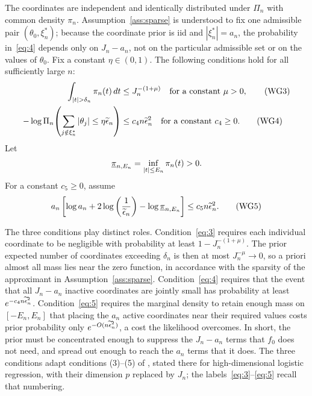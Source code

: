 \begin{assumption}\label{ass:prior}
The coordinates are independent and identically distributed under $\Pi_n$ with common density $\pi_n$. Assumption~\ref{ass:sparse} is understood to fix one admissible pair $(\theta_0,\xi_n^*)$; because the coordinate prior is iid and $|\xi_n^*|=a_n$, the probability in~\eqref{eq:4} depends only on $J_n-a_n$, not on the particular admissible set or on the values of $\theta_0$. Fix a constant $\eta\in(0,1)$. The following conditions hold for all sufficiently large $n$:
\begin{align}
\int_{|t|>\delta_n}\pi_n(t)\,dt
&\leq J_n^{-(1+\mu)}
\quad\text{for a constant }\mu>0, \tag{WG3}\label{eq:3}\\
-\log\Pi_n\!\left(\sum_{j\notin\xi_n^*}|\theta_j|\leq\eta\en\right)
&\leq c_4n\en^2
\quad\text{for a constant }c_4\geq0. \tag{WG4}\label{eq:4}
\end{align}
Let
\begin{align*}
\underline{\pi}_{n,E_n}=\inf_{|t|\leq E_n}\pi_n(t)>0.
\end{align*}
For a constant $c_5\geq0$, assume
\begin{align}
a_n\left[\log a_n+2\log\left(\frac1{\widetilde{\epsilon}_n}\right)-\log\underline{\pi}_{n,E_n}\right]
\leq c_5n\widetilde{\epsilon}_n^2. \tag{WG5}\label{eq:5}
\end{align}
\end{assumption}

The three conditions play distinct roles. Condition~\eqref{eq:3} requires each individual coordinate to be negligible with probability at least $1-J_n^{-(1+\mu)}$. The prior expected number of coordinates exceeding $\delta_n$ is then at most $J_n^{-\mu}\to0$, so a priori almost all mass lies near the zero function, in accordance with the sparsity of the approximant in Assumption~\ref{ass:sparse}. Condition~\eqref{eq:4} requires that the event that all $J_n-a_n$ inactive coordinates are jointly small has probability at least $e^{-c_4n\widetilde{\epsilon}_n^2}$. Condition~\eqref{eq:5} requires the marginal density to retain enough mass on $[-E_n,E_n]$ that placing the $a_n$ active coordinates near their required values costs prior probability only $e^{-O(n\widetilde{\epsilon}_n^2)}$, a cost the likelihood overcomes. In short, the prior must be concentrated enough to suppress the $J_n-a_n$ terms that $f_0$ does not need, and spread out enough to reach the $a_n$ terms that it does. The three conditions adapt conditions (3)--(5) of \citet{WeiGhosal2020}, stated there for high-dimensional logistic regression, with their dimension $p$ replaced by $J_n$; the labels~\eqref{eq:3}--\eqref{eq:5} recall that numbering.

